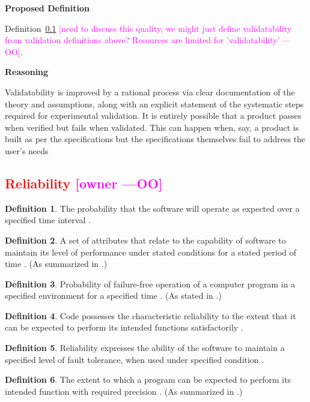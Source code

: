 \documentclass[letterpaper,cleveref]{lipics-v2019}
\newcommand{\authornote}[3]{\textcolor{#1}{[#3 ---#2]}}
\newcommand{\authornote}[3]{}
\newcommand{\oo}[1]{\authornote{magenta}{OO}{#1}} %
\newcommand{\notdone}[1]{\textcolor{red}{#1}}
\theoremstyle{definition}
\newtheorem{defn}{Definition}
\begin{document}
\noindent \textbf{Proposed Definition}

Definition~\ref{} \oo{need to discuss this quality, we might just define
  validatability from validation definitions above? Resources are limited for
  'validatability'}.

\noindent \textbf{Reasoning}

Validatability is improved by a rational process via clear documentation of the
theory and assumptions, along with an explicit statement of the systematic steps
required for experimental validation. It is entirely possible that a product
passes when verified but fails when validated. This can happen when, say, a
product is built as per the specifications but the specifications themselves
fail to address the user’s needs

\subsection{\notdone{Reliability} \oo{owner}}

\begin{defn}
	The probability that the software will operate as expected over a specified
	time interval \citep{GhezziEtAl2003}.
\end{defn}

\begin{defn}
  A set of attributes that relate to the capability of software to maintain its
  level of performance under stated conditions for a stated period of time
  \citep{iso2001iec}. (As summarized in \citet{berander2005software}.)
\end{defn}

\begin{defn} \label{reliabilitySelected1} Probability of failure-free operation
  of a computer program in a specified environment for a specified time
  \citep{musa1987software}. (As stated in \citet{pressman2005software}.)
\end{defn}

\begin{defn}
	Code possesses the characteristic reliability to the extent that it can be
	expected to perform its intended functions satisfactorily
	\citep{boehm1976quantitative}.
\end{defn}

\begin{defn} \label{reliabilitySelected2}
   Reliability expresses the ability of the software to maintain a specified
   level of fault tolerance, when used under specified condition \citep{singh2013different}.
\end{defn}
\begin{defn}
	The extent to which a program can be expected to perform its intended
	function with required precision \citep{McCallEtAl1977}. (As summarized in
    \citet{VanVliet2000}.)
\end{defn}
\end{document}
